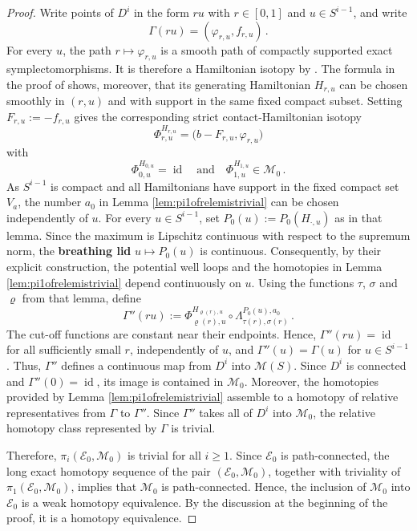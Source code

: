 \documentclass{amsart}
\theoremstyle{definition}
\newcommand{\EE}{\mathcal E}
\newcommand{\MM}{\mathcal M}
\DeclareMathOperator{\id}{\mathrm{id}}
\begin{document}
\begin{proof}
Write points of $D^i$ in the form $ru$
with $r\in[0,1]$ and $u\in S^{i-1}$,
and write
\[
\Gamma(ru)=(\varphi_{r,u},f_{r,u})
\,.
\]
For every $u$,
the path $r\mapsto\varphi_{r,u}$
is a smooth path of compactly supported
exact symplectomorphisms.
It is therefore a Hamiltonian isotopy by
\cite[Proposition~9.3.1 and
Corollary~9.3.3, pp.~369--370]{mcdsal17}.
The formula in the proof of
\cite[Proposition~9.3.1]{mcdsal17}
shows, moreover, that its generating Hamiltonian
$H_{r,u}$ can be chosen smoothly in $(r,u)$
and with support in the same fixed compact subset.
Setting $F_{r,u}:=-f_{r,u}$ gives
the corresponding strict contact-Hamiltonian isotopy
\[
\Phi_{r,u}^{H_{r,u}}=
\big(b-F_{r,u},\varphi_{r,u}\big)
\]
with
\[
\Phi_{0,u}^{H_{0,u}}=\id
\quad\text{and}\quad
\Phi_{1,u}^{H_{1,u}}\in\MM_0
\,.
\]
As $S^{i-1}$ is compact
and all Hamiltonians have support
in the fixed compact set $V_a$,
the number $a_0$ in
Lemma \ref{lem:pi1ofrelemistrivial}
can be chosen independently of $u$.
For every $u\in S^{i-1}$, set
$P_0(u):=P_0(H_{\cdot,u})$
as in that lemma.
Since the maximum is Lipschitz continuous
with respect to the supremum norm,
the {\bf breathing lid} $u\mapsto P_0(u)$ is continuous.
Consequently, by their explicit construction,
the potential well loops and the homotopies in
Lemma \ref{lem:pi1ofrelemistrivial}
depend continuously on $u$.
Using the functions $\tau$, $\sigma$ and $\varrho$
from that lemma, define
\[
\Gamma''(ru):=
\Phi_{\varrho(r),u}^{H_{\varrho(r),u}}
\circ
\Lambda_{\tau(r),\sigma(r)}^{P_0(u),a_0}
\,.
\]
The cut-off functions are constant near their endpoints.
Hence, $\Gamma''(ru)=\id$
for all sufficiently small $r$,
independently of $u$, and
$\Gamma''(u)=\Gamma(u)$
for $u\in S^{i-1}$.
Thus, $\Gamma''$ defines a continuous map
from $D^i$ into $\MM(S)$.
Since $D^i$ is connected and
$\Gamma''(0)=\id$,
its image is contained in $\MM_0$.
Moreover, the homotopies provided by
Lemma \ref{lem:pi1ofrelemistrivial}
assemble to a homotopy of relative representatives
from $\Gamma$ to $\Gamma''$.
Since $\Gamma''$ takes all of $D^i$
into $\MM_0$,
the relative homotopy class represented by $\Gamma$
is trivial.

Therefore,
$\pi_i(\EE_0,\MM_0)$ is trivial for all $i\geq1$.
Since $\EE_0$ is path-connected,
the long exact homotopy sequence
of the pair $(\EE_0,\MM_0)$,
together with triviality of $\pi_1(\EE_0,\MM_0)$,
implies that $\MM_0$ is path-connected.
Hence, the inclusion of $\MM_0$ into $\EE_0$ 
is a weak homotopy equivalence.
By the discussion at the beginning of the proof,
it is a homotopy equivalence.
\end{proof}
\end{document}
